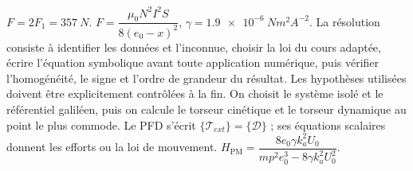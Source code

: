 \begin{corrigebox}[Corrigé]
$F=2F_1=\SI{357}{N}$.
$F=\dfrac{\mu_0 N^2 I^2 S}{8\left(e_0 - x  \right)^2}$, $\gamma = \SI{1,9e-6}{Nm^2A^{-2}}$.
La résolution consiste à identifier les données et l'inconnue, choisir la loi du cours adaptée, écrire l'équation symbolique avant toute application numérique, puis vérifier l'homogénéité, le signe et l'ordre de grandeur du résultat. Les hypothèses utilisées doivent être explicitement contrôlées à la fin.
On choisit le système isolé et le référentiel galiléen, puis on calcule le torseur cinétique et le torseur dynamique au point le plus commode. Le PFD s'écrit $\{\mathcal T_{ext}\}=\{\mathcal D\}$ ; ses équations scalaires donnent les efforts ou la loi de mouvement.
$H_{\text{PM}}=\dfrac{8e_0\gamma k_a^2 U_0}{mp^2e_0^3-8\gamma k_a^2 U_0^2}$.
\end{corrigebox}
